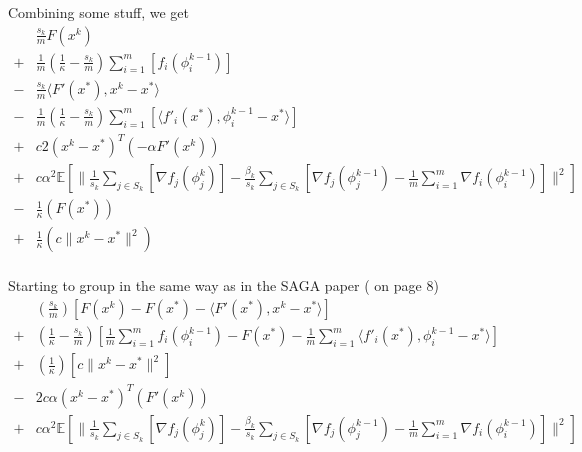 \documentclass[11pt]{article}
\begin{document}
Combining some stuff, we get
\begin{align*}
	&\frac{s_k}{m}  F(x^k) \\
	+&\frac{1}{m}  \left(\frac{1}{\kappa} - \frac{s_k}{m} \right )\sum_{i =1}^{m} \left[  f_i(\phi_i^{k-1}) \right]\\
	-&\frac{s_k}{m}  \langle F'(x^*), x^k - x^*\rangle  \\
	-&\frac{1}{m}\left(\frac{1}{\kappa} - \frac{s_k}{m} \right )   \sum_{i =1}^{m} \left[   \langle f'_i(x^*), \phi_i^{k-1} - x^*\rangle \right] \\
		+&c 2 (x^k - x^* )^T (- \alpha  F'(x^k))\\
		+&c  \alpha^2 \mathbb{E} \left[  \|\frac{1}{s_k} \sum_{j \in S_k} \left[  \nabla f_j(\phi_j^{k}) \right]- \frac{ \beta_k }{s_k} \sum_{j \in S_k} \left[  \nabla f_j(\phi^{k-1}_j) - \frac{1}{m} \sum_{i = 1}^{m }  \nabla f_i (\phi_i^{k-1}) \right]  \|^2 \right] \\
		-&\frac{1}{\kappa}( F(x^*) )\\
		+&\frac{1}{\kappa}( c \|x^k - x^* \|^2)\\
\end{align*}

\newpage

Starting to group in the same way as in the SAGA paper ( on page 8)
\begin{align*}
	& \left( \frac{s_k}{m}  \right) \left[   F(x^k) - F(x^*) -  \langle F'(x^*), x^k - x^*\rangle \right] \\
	+& \left( \frac{1}{\kappa} - \frac{s_k}{m}\right) \left[ \frac{1}{m}\sum_{i =1}^{m}  f_i(\phi_i^{k-1})   - F(x^*)  -\frac{1}{m}\sum_{i =1}^{m}   \langle f'_i(x^*), \phi_i^{k-1} - x^*\rangle \right] \\
	+& \left( \frac{1}{\kappa} \right) \left[ c \|x^k - x^* \|^2 \right] \\
	-&2c \alpha(x^k - x^* )^T ( F'(x^k))\\
	+&c  \alpha^2 \mathbb{E} \left[  \|\frac{1}{s_k} \sum_{j \in S_k} \left[  \nabla f_j(\phi_j^{k}) \right]- \frac{ \beta_k }{s_k} \sum_{j \in S_k} \left[  \nabla f_j(\phi^{k-1}_j) - \frac{1}{m} \sum_{i = 1}^{m }  \nabla f_i (\phi_i^{k-1}) \right]  \|^2 \right]  \\
\end{align*}
 
 
\newpage
\end{document}
